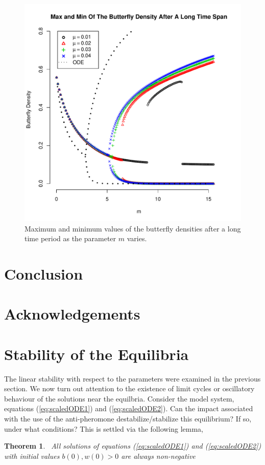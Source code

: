 \documentclass[12pt]{article}
\newtheorem{theorem}{Theorem}[section]
\begin{document}
\begin{figure}[htb]
  \centering
  \includegraphics[width=12cm]{img/maxMinByM-mu-01-04.pdf}
  \caption[Maximum and minimum values of the butterfly
  density]{Maximum and minimum values of the butterfly densities after
    a long time period as the parameter $m$ varies.}
  \label{fig:maxMinButterflySmallMu}
\end{figure}

\section{Conclusion}

\section{Acknowledgements}

\clearpage

\appendix

\section{Stability of the Equilibria}
\label{appendix:stability}

The linear stability with respect to the parameters were examined in
the previous section. We now turn out attention to the existence of
limit cycles or oscillatory behaviour of the solutions near the
equilbria. Consider the model system, equations (\ref{eq:scaledODE1})
and (\ref{eq:scaledODE2}). Can the impact associated with the use of
the anti-pheromone destabilize/stabilize this equilibrium? If so,
under what conditions? This is settled via the following lemma,
\begin{theorem}
  \bigskip\ All solutions of equations (\ref{eq:scaledODE1}) and
  (\ref{eq:scaledODE2}) with initial values
  $b\left( 0\right) ,w\left( 0\right) >0$ are always non-negative
\end{theorem}
\end{document}
